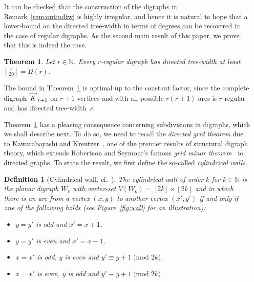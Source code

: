 \documentclass[a4paper,10pt]{article}
\newtheorem{theorem}{Theorem}
\newtheorem{definition}{Definition}
\newcommand{\bivec}[1]{\overset{\text{\tiny$\longleftrightarrow$}}{#1}}
\begin{document}
It can be checked that the construction of the digraphs in Remark~\ref{rem:outindtw} is highly irregular, and hence it is natural to hope that a lower-bound on the directed tree-width in terms of degrees can be recovered in the case of regular digraphs. As the second main result of this paper, we prove that this is indeed the case.

\begin{theorem}\label{thm:main2}
Let $r\in \mathbb{N}$. Every $r$-regular digraph has directed tree-width at least $\left\lfloor\frac{r}{20}\right\rfloor=\Omega(r)$.
\end{theorem}

The bound in Theorem~\ref{thm:main2} is optimal up to the constant factor, since the complete digraph $\bivec{K}_{r+1}$ on $r+1$ vertices and with all possible $r(r+1)$ arcs is $r$-regular and has directed tree-width~$r$. 

Theorem~\ref{thm:main2} has a pleasing consequence concerning subdivisions in digraphs, which we shall describe next. To do so, we need to recall the \emph{directed grid theorem} due to Kawarabayashi and Kreutzer~\cite{MR3388245}, one of the premier results of structural digraph theory, which extends Robertson and Seymour's famous \emph{grid minor theorem}~\cite{MR854606} to directed graphs. To state the result, we first define the so-called \emph{cylindrical walls}.

\begin{definition}[Cylindrical wall, cf.~\cite{MR4141197}]
The \emph{cylindrical wall of order $k$} for $k \in \mathbb{N}$ is the planar digraph $W_k$ with vertex-set $V(W_k)=[2k]\times [2k]$ and in which there is an arc from a vertex $(x,y)$ to another vertex $(x',y')$ if and only if one of the following holds (see Figure~\ref{fig:wall} for an illustration):
\begin{itemize}
    \item $y=y'$ is odd and $x'=x+1$.
    \item $y=y'$ is even and $x'=x-1$. 
    \item $x=x'$ is odd, $y$ is even and $y'\equiv y+1 \text{ (mod }2k)$.
    \item $x=x'$ is even, $y$ is odd and $y'\equiv y+1 \text{ (mod }2k)$.
\end{itemize}
\end{definition}
\end{document}
